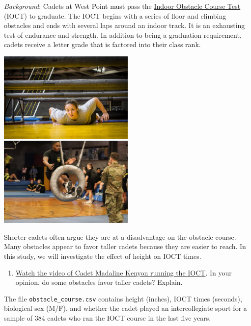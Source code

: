 \documentclass[]{book}
\providecommand{\tightlist}{%
  \setlength{\itemsep}{0pt}\setlength{\parskip}{0pt}}
\begin{document}
\emph{Background}: Cadets at West Point must pass the \href{https://www.youtube.com/watch?v=94tPO0fGtJo\&t=77s}{Indoor Obstacle Course Test} (IOCT) to graduate. The IOCT begins with a series of floor and climbing obstacles and ends with several laps around an indoor track. It is an exhausting test of endurance and strength. In addition to being a graduation requirement, cadets receive a letter grade that is factored into their class rank.

\includegraphics[width=0.5\textwidth,height=\textheight]{./images/crawlObstacle.jpg} \includegraphics[width=0.5\textwidth,height=\textheight]{./images/tireObstacle.jpg}

Shorter cadets often argue they are at a disadvantage on the obstacle course. Many obstacles appear to favor taller cadets because they are easier to reach. In this study, we will investigate the effect of height on IOCT times.

\begin{enumerate}
\def\labelenumi{\arabic{enumi}.}
\tightlist
\item
  \href{https://www.youtube.com/watch?v=94tPO0fGtJo\&t=77s}{Watch the video of Cadet Madaline Kenyon running the IOCT}. In your opinion, do some obstacles favor taller cadets? Explain.
\end{enumerate}

\vspace{1in}

The file \texttt{obstacle\_course.csv} contains height (inches), IOCT times (seconds), biological sex (M/F), and whether the cadet played an intercollegiate sport for a sample of 384 cadets who ran the IOCT course in the last five years.
\end{document}

